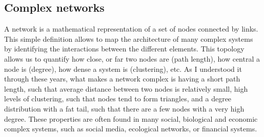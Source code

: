\subsection{\label{subsec:Complex networks} Complex networks}
A network is a mathematical representation of a set of nodes connected by links. This simple definition allows to map the architecture of many complex systems by identifying the interactions between the different elements. This topology allows us to quantify how close, or far two nodes are (path length), how central a node is (degree), how dense a system is (clustering), etc. As I understood it through these years, what makes a network complex is having a short path length, such that average distance between two nodes is relatively small, high levels of clustering, such that nodes tend to form triangles, and a degree distribution with a fat tail, such that there are a few nodes with a very high degree. These properties are often found in many social, biological and economic complex systems, such as social media, ecological networks, or financial systems.

